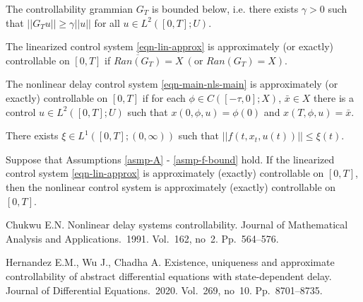 \documentclass[12pt]{llncs}
\begin{document}
\begin{asmp}\label{asmp-cg-inv}
The controllability grammian $G_T$ is bounded below, i.e. there exists $\gamma > 0$ such that $||G_T u|| \ge \gamma ||u||$ for all $u \in L^2([0,T];U)$.
\end{asmp}

\begin{definition}
The linearized control system \eqref{eqn-lin-approx} is approximately (or exactly) controllable on $[0,T]$ if $\overline{Ran(G_T)} = X~ (\text{or } Ran(G_T) = X)$.
\end{definition}

\begin{definition}
The nonlinear delay control system \eqref{eqn-main-nls-main} is approximately (or exactly) controllable on $[0,T]$ if for each $\phi \in C([-\tau,0];X)$, $\bar{x} \in X$ there is a control $u \in L^2([0,T];U)$ such that $x(0,\phi,u) = \phi(0)$ and $x(T,\phi,u) = \bar{x}$.
\end{definition}

\begin{asmp}\label{asmp-f-bound}
There exists $\xi \in L^1([0,T];(0,\infty))$ such that $||f(t,x_t,u(t))|| \le \xi(t)$.
\end{asmp}

\begin{theorem}
Suppose that Assumptions \ref{asmp-A} - \ref{asmp-f-bound} hold. If the linearized control system \eqref{eqn-lin-approx} is approximately (exactly) controllable on $[0,T]$, then the nonlinear control system is approximately (exactly) controllable on $[0,T]$.
\end{theorem}



\begin{thebibliography}{9} %

%

Chukwu E.N. Nonlinear delay systems controllability. Journal of Mathematical Analysis and Applications.~1991. Vol.~162, no~2. Pp.~564--576.

Hernandez E.M., Wu J., Chadha A. Existence, uniqueness and approximate controllability of abstract differential equations with state-dependent delay. Journal of Differential Equations.~2020. Vol.~269, no~10. Pp.~8701--8735.

\end{thebibliography}


%
%
%


\end{document}
